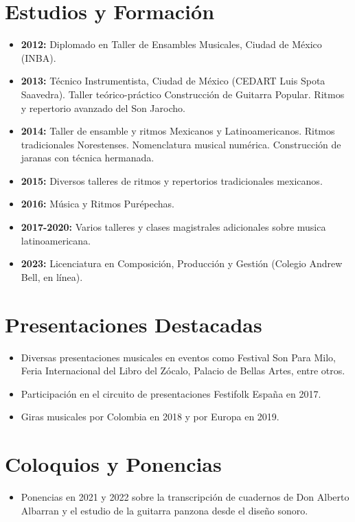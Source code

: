 \documentclass[a4paper,10pt]{article}
\begin{document}
\section*{Estudios y Formación}
\begin{itemize}[left=0pt]
    \item \textbf{2012:} Diplomado en Taller de Ensambles Musicales, Ciudad de México (INBA).
    \item \textbf{2013:} Técnico Instrumentista, Ciudad de México (CEDART Luis Spota Saavedra).
          Taller teórico-práctico Construcción de Guitarra Popular.
          Ritmos y repertorio avanzado del Son Jarocho.
    \item \textbf{2014:} Taller de ensamble y ritmos Mexicanos y Latinoamericanos.
          Ritmos tradicionales Norestenses.
          Nomenclatura musical numérica.
          Construcción de jaranas con técnica hermanada.
    \item \textbf{2015:} Diversos talleres de ritmos y repertorios tradicionales mexicanos.
    \item \textbf{2016:} Música y Ritmos Purépechas.
    \item \textbf{2017-2020:} Varios talleres y clases magistrales adicionales sobre musica latinoamericana.
    \item \textbf{2023:} Licenciatura en Composición, Producción y Gestión (Colegio Andrew Bell, en línea).
\end{itemize}

\section*{Presentaciones Destacadas}
\begin{itemize}[left=0pt]
    \item Diversas presentaciones musicales en eventos como Festival Son Para Milo, Feria Internacional del Libro del Zócalo, Palacio de Bellas Artes, entre otros.
    \item Participación en el circuito de presentaciones Festifolk España en 2017.
    \item Giras musicales por Colombia en 2018 y por Europa en 2019.
\end{itemize}

\section*{Coloquios y Ponencias}
\begin{itemize}[left=0pt]
    \item Ponencias en 2021 y 2022 sobre la transcripción de cuadernos de Don Alberto Albarran y el estudio de la guitarra panzona desde el diseño sonoro.
\end{itemize}
\end{document}
